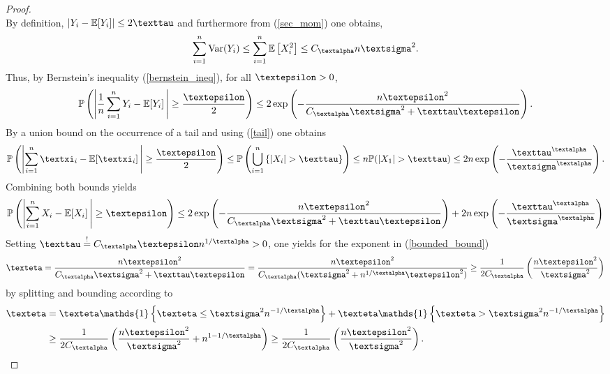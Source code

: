 \documentclass[openany]{book}
\begin{document}
\begin{lemma}
\begin{proof}
\begin{equation*}
\end{equation*}
By definition, $\vert Y_i-\mathbb E[Y_i]\vert \leq 2\gtau$ and furthermore from (\ref{sec_mom}) one obtains,
\begin{equation*}
    \sum_{i=1}^n\mathrm{Var}(Y_i)\leq \sum_{i=1}^n\mathbb E\left[X_i^2\right]\leq C_{\galpha}n\gsigma^2.
\end{equation*}
Thus, by Bernstein's inequality (\ref{bernstein_ineq}), for all $\gepsilon>0$,
\begin{equation}\label{bounded_bound}
    \mathbb P\left(\left\vert\frac{1}{n}\sum_{i=1}^n Y_i-\mathbb E[Y_i]\,\right\vert\geq \frac{\gepsilon}{2}\right)\leq 2\exp\left(-\frac{n\gepsilon^2}{C_{\galpha}\gsigma^2+\gtau \gepsilon}\right).
\end{equation}
By a union bound on the occurrence of a tail and using (\ref{tail}) one obtains
\begin{equation*}
    \mathbb P\left(\left\vert\sum_{i=1}^n\gxi_i-\mathbb E[\gxi_i]\,\right\vert\geq \frac{\gepsilon}{2}\right)\leq \mathbb P\left(\bigcup_{i=1}^n\left\{\vert X_i\vert >\gtau\right\}\right)\leq n\mathbb P(\vert X_1\vert >\gtau)\leq 2n\exp\left(-\frac{\gtau^{\galpha}}{\gsigma^{\galpha}}\right).
\end{equation*}
Combining both bounds yields
\begin{equation*}
    \mathbb P\left(\left\vert\sum_{i=1}^n X_i-\mathbb E[X_i]\,\right\vert\geq \gepsilon\right)\leq 2\exp\left(-\frac{n\gepsilon^2}{C_{\galpha}\gsigma^2+\gtau \gepsilon}\right)+2n\exp\left(-\frac{\gtau^{\galpha}}{\gsigma^{\galpha}}\right)
\end{equation*}
Setting $\gtau\overset{!}{=}C_{\galpha} \gepsilon n^{1/\galpha}>0$, one yields for the exponent in (\ref{bounded_bound})
\begin{equation*}
    \geta=\frac{n\gepsilon^2}{C_{\galpha}\gsigma^2+\gtau \gepsilon}= \frac{n\gepsilon^2}{C_{\galpha}(\gsigma^2+n^{1/\galpha}\gepsilon^2)}\geq \frac{1}{2C_{\galpha}} \left(\frac{n\gepsilon^2}{\gsigma^2}\right)
\end{equation*}
by splitting and bounding according to
\begin{equation*}
    \begin{split}
        \geta&=\geta\mathds{1}\left\{\geta\leq \gsigma^2n^{-1/\galpha} \right\}+\geta\mathds{1}\left\{\geta>\gsigma^2n^{-1/\galpha} \right\} \\
        &\geq \frac{1}{2C_{\galpha}}\left(\frac{n\gepsilon^2}{\gsigma^2}+n^{1-1/\galpha}\right)\geq \frac{1}{2C_{\galpha}}\left(\frac{n\gepsilon^2}{\gsigma^2}\right).

\end{split}
\end{equation*}
\end{proof}
\end{lemma}
\end{document}
